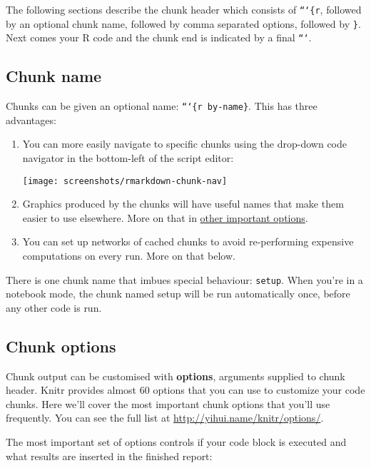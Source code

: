 \documentclass[]{book}
\begin{document}
The following sections describe the chunk header which consists of
\texttt{```\{r}, followed by an optional chunk name, followed by comma
separated options, followed by \texttt{\}}. Next comes your R code and
the chunk end is indicated by a final \texttt{```}.

\subsection{Chunk name}\label{chunk-name}

Chunks can be given an optional name: \texttt{```\{r\ by-name\}}. This
has three advantages:

\begin{enumerate}
\def\labelenumi{\arabic{enumi}.}
\item
  You can more easily navigate to specific chunks using the drop-down
  code navigator in the bottom-left of the script editor:

  \begin{center}\texttt{[image: screenshots/rmarkdown-chunk-nav]} \end{center}
\item
  Graphics produced by the chunks will have useful names that make them
  easier to use elsewhere. More on that in
  \protect\hyperlink{other-important-options}{other important options}.
\item
  You can set up networks of cached chunks to avoid re-performing
  expensive computations on every run. More on that below.
\end{enumerate}

There is one chunk name that imbues special behaviour: \texttt{setup}.
When you're in a notebook mode, the chunk named setup will be run
automatically once, before any other code is run.

\subsection{Chunk options}\label{chunk-options}

Chunk output can be customised with \textbf{options}, arguments supplied
to chunk header. Knitr provides almost 60 options that you can use to
customize your code chunks. Here we'll cover the most important chunk
options that you'll use frequently. You can see the full list at
\url{http://yihui.name/knitr/options/}.

The most important set of options controls if your code block is
executed and what results are inserted in the finished report:
\end{document}

